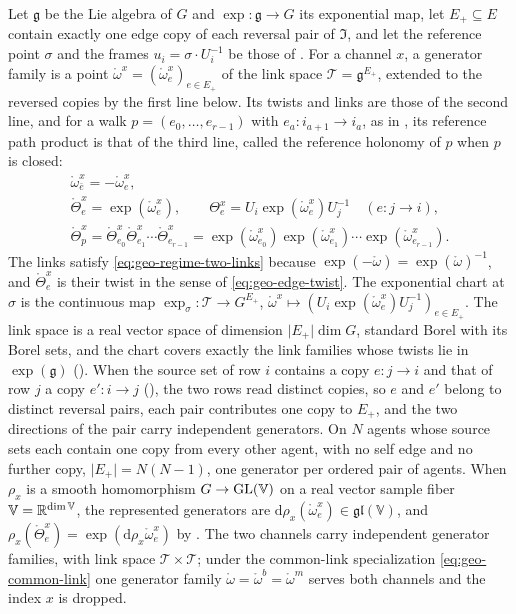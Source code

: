 Let $\mathfrak g$ be the Lie algebra of $G$ and $\exp:\mathfrak g\to G$ its exponential map, let
$E_+\subseteq E$ contain exactly one edge copy of each reversal pair of $\mathfrak I$, and let the
reference point $\sigma$ and the frames $u_i=\sigma\cdot U_i^{-1}$ be those of
. For a channel $x$, a generator family is a point
$\mathring\omega^x=(\mathring\omega^x_e)_{e\in E_+}$ of the link space $\mathscr T=\mathfrak g^{E_+}$,
extended to the reversed copies by the first line below. Its twists and links are those of the second
line, and for a walk $p=(e_0,\ldots,e_{r-1})$ with $e_a:i_{a+1}\to i_a$, as in
, its reference path product is that of the third line, called the reference
holonomy of $p$ when $p$ is closed:
\begin{gather}
\mathring\omega^x_{\bar e}=-\mathring\omega^x_e,
\label{eq:link-generator-reversal}\\
\mathring\Theta^x_e=\exp(\mathring\omega^x_e),
\qquad
\Theta^x_e=U_i\exp(\mathring\omega^x_e)U_j^{-1}\quad(e:j\to i),
\label{eq:link-chart}\\
\mathring\Theta^x_p=\mathring\Theta^x_{e_0}\mathring\Theta^x_{e_1}\cdots\mathring\Theta^x_{e_{r-1}}
=\exp(\mathring\omega^x_{e_0})\exp(\mathring\omega^x_{e_1})\cdots\exp(\mathring\omega^x_{e_{r-1}}).
\label{eq:link-reference-holonomy}
\end{gather}
The links satisfy \cref{eq:geo-regime-two-links} because $\exp(-\mathring\omega)=\exp(\mathring\omega)^{-1}$,
and $\mathring\Theta^x_e$ is their twist in the sense of \cref{eq:geo-edge-twist}. The exponential chart
at $\sigma$ is the continuous map $\exp_\sigma:\mathscr T\to G^{E_+}$,
$\mathring\omega^x\mapsto(U_i\exp(\mathring\omega^x_e)U_j^{-1})_{e\in E_+}$. The link space is a real
vector space of dimension $\lvert E_+\rvert\dim G$, standard Borel with its Borel sets, and the chart
covers exactly the link families whose twists lie in $\exp(\mathfrak g)$ ().
When the source set of row $i$ contains a copy $e:j\to i$ and that of row $j$ a copy $e':i\to j$
(), the two rows read distinct copies, so $e$ and $e'$ belong to
distinct reversal pairs, each pair contributes one copy to $E_+$, and the two directions of the pair
carry independent generators. On $N$ agents whose source sets each contain one copy from every other
agent, with no self edge and no further copy, $\lvert E_+\rvert=N(N-1)$, one generator per ordered
pair of agents.
When $\rho_x$ is a smooth homomorphism $G\to\mathrm{GL}(\mathbb V)$ on a real vector sample fiber
$\mathbb V=\mathbb R^{\dim\mathbb V}$, the represented generators are
$\mathrm d\rho_x(\mathring\omega^x_e)\in\mathfrak{gl}(\mathbb V)$, and
$\rho_x(\mathring\Theta^x_e)=\exp(\mathrm d\rho_x\mathring\omega^x_e)$ by .
The two channels carry independent generator families, with link space $\mathscr T\times\mathscr T$;
under the common-link specialization \cref{eq:geo-common-link} one generator family
$\mathring\omega=\mathring\omega^b=\mathring\omega^m$ serves both channels and the index $x$ is dropped.

